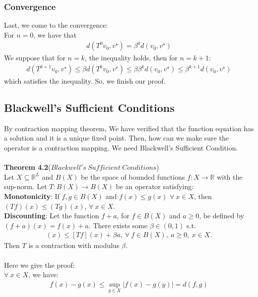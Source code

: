 \documentclass{article}
\begin{document}
\subsubsection{Convergence}
Last, we come to the convergence:\\
For $n = 0$, we have that
\begin{align*}
	d(T^0 v_0, v^\star) = \beta^0 d(v_0, v^\star)
\end{align*}
We suppose that for $n = k$, the inequality holds, then for $n = k + 1$:
\begin{align*}
	d(T^{k+1} v_0, v^\star) \leq \beta d(T^k v_0, v^\star) \leq \beta \beta^k d(v_0, v^\star) \leq \beta^{k+1} d(v_0, v^\star)
\end{align*}
which satisfies the inequality. So, we finish our proof.


\subsection{Blackwell's Sufficient Conditions}
By contraction mapping theorem, We have verified that the function equation has a solution and it is a unique fixed point. Then, how can we make sure the operator is a contraction mapping. We need Blackwell's Sufficient Condition.\\\\
\textbf{Theorem 4.2}($Blackwell's\ Sufficient\ Conditions$)\\
Let $X \subseteq \mathbb{R}^L$ and $B(X)$ be the space of bounded functions $f: X \to \mathbb{R}$ with the sup-norm. Let $T: B(X) \to B(X)$ be an operator satisfying:\\
\indent	\textbf{Monotonicity}: If $f, g \in B(X)$ and $f(x) \leq g(x)$ $\forall\ x \in X$, then $(Tf)(x) \leq (Tg)(x)$, $\forall\ x \in X$.\\
\indent	\textbf{Discounting}: Let the function $f + a$, for $f \in B(X)$ and $a \geq 0$, be defined by $(f + a)(x) = f(x) + a$. There exists some $\beta \in (0, 1)$ s.t.
\begin{align*}
	[T(f + a)](x) \leq [Tf](x) + \beta a,\ \forall\ f \in B(X),\ a \geq 0,\ x \in X.
\end{align*}
Then $T$ is a contraction with modulus $\beta$.\\\\
Here we give the proof:\\
\indent $\forall\ x \in X$, we have:
\begin{align*}
	f(x) - g(x) \leq \mathop{sup}\limits_{y \in X} |f(x) - g(y)| = d(f, g)
\end{align*}
\end{document}
